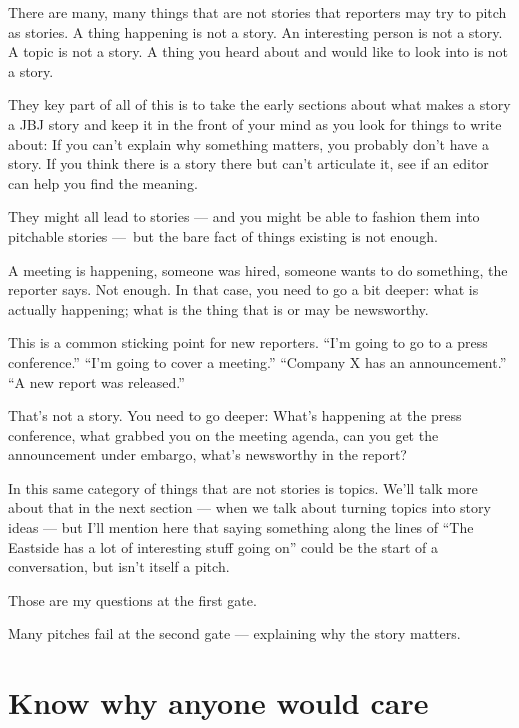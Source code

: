 \documentclass[
  11pt,
  american,
  letterpaperpaper,
  extrafontsizes,onecolumn,openright
  ]{memoir}
\begin{document}
There are many, many things that are not stories that reporters may try to pitch as stories. A thing happening is not a story. An interesting person is not a story. A topic is not a story. A thing you heard about and would like to look into is not a story.

\leavevmode{}%
\begin{greybox}[frametitle=Onboarding Path]
They key part of all of this is to take the early sections about what makes a story a JBJ story and keep it in the front of your mind as you look for things to write about: If you can't explain why something matters, you probably don't have a story. If you think there is a story there but can't articulate it, see if an editor can help you find the meaning.

\end{greybox}

They might all lead to stories --- and you might be able to fashion them into pitchable stories ---~but the bare fact of things existing is not enough.

A meeting is happening, someone was hired, someone wants to do something, the reporter says. Not enough. In that case, you need to go a bit deeper: what is actually happening; what is the thing that is or may be newsworthy.

This is a common sticking point for new reporters. \enquote{I'm going to go to a press conference.} \enquote{I'm going to cover a meeting.} \enquote{Company X has an announcement.} \enquote{A new report was released.}

That's not a story. You need to go deeper: What's happening at the press conference, what grabbed you on the meeting agenda, can you get the announcement under embargo, what's newsworthy in the report?

In this same category of things that are not stories is topics. We'll talk more about that in the next section --- when we talk about turning topics into story ideas --- but I'll mention here that saying something along the lines of \enquote{The Eastside has a lot of interesting stuff going on} could be the start of a conversation, but isn't itself a pitch.

Those are my questions at the first gate.

Many pitches fail at the second gate --- explaining why the story matters.

\hypertarget{know-why-anyone-would-care}{%
\section*{Know why anyone would care}\label{know-why-anyone-would-care}}
\end{document}
